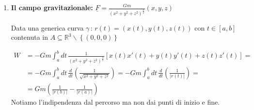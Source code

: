 \begin{enumerate}
	\item \textbf{Il campo gravitazionale:} 
	$\underline{F}=\frac{Gm}{(x^2 + y^2 + z^2)^{\frac{3}{2}}}(x,y,z)$
	
	Data una generica curva $\gamma \, : \, r(t)=(x(t),y(t),z(t))$ con $t\in[a,b]$ contenuta in $A\subseteq \mathbb{R}^3 \backslash\left\{(0,0,0)\right\}$
	
	\begin{align}
		W {}&= -Gm \int_{a}^{b} dt \, \frac{1}{(x^2 + y^2 + z^2)^{\frac{3}{2}}} [x(t)x'(t) + y(t)y'(t) + z(t)z'(t)] = \nonumber \\ 
		&= -Gm \int_{a}^{b} dt \, \frac{d}{dt}\left(\frac{1}{\sqrt{x^2 + y^2 + z^2}}\right)= -Gm \int_{a}^{b} dt \, \frac{d}{dt}\left(\frac{1}{|r(t)|}\right)  = \nonumber \\ 
		&= Gm\left(\frac{1}{|r(b)|} - \frac{1}{|r(a)|}\right)
	\end{align}
	Notiamo l'indipendenza dal percorso ma non dai punti di inizio e fine.
\end{enumerate}
